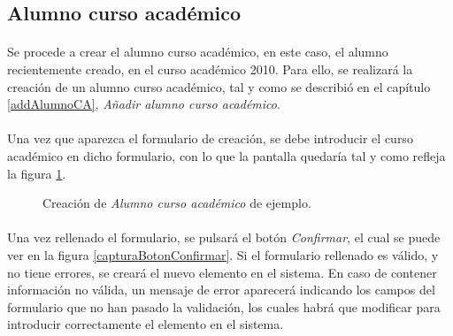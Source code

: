 \subsection{Alumno curso académico}

  \paragraph{}Se procede a crear el alumno curso académico, en este caso, el
  alumno recientemente creado, en el curso académico 2010. Para ello, se
  realizará la creación de un alumno curso académico, tal y como se describió en
  el capítulo \ref{addAlumnoCA}, \textit{Añadir alumno curso académico}.

  \paragraph{}Una vez que aparezca el formulario de creación, se debe introducir
  el curso académico en dicho formulario, con lo que la pantalla quedaría tal y
  como refleja la figura \ref{ejemploAddAlumnoCA}.

  \begin{figure}[!ht]
    \begin{center}
      \caption{Creación de \textit{Alumno curso académico} de ejemplo.}
      \label{ejemploAddAlumnoCA}
    \end{center}
  \end{figure}

  \paragraph{}Una vez rellenado el formulario, se pulsará el botón
  \textit{Confirmar}, el cual se puede ver en la figura
  \ref{capturaBotonConfirmar}. Si el formulario rellenado es válido, y no tiene
  errores, se creará el nuevo elemento en el sistema. En caso de contener
  información no válida, un mensaje de error aparecerá indicando los campos
  del formulario que no han pasado la validación, los cuales habrá que modificar
  para introducir correctamente el elemento en el sistema.
